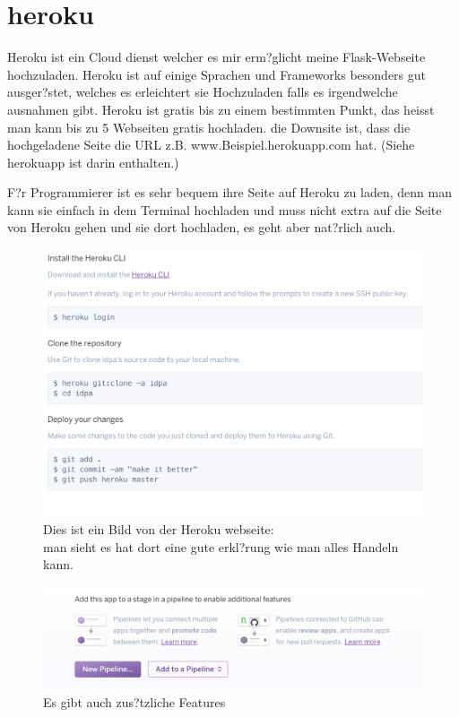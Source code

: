 \documentclass{article}
\begin{document}
\cleardoublepage
















\section{heroku}
Heroku ist ein Cloud dienst welcher es mir erm?glicht meine Flask-Webseite hochzuladen.
Heroku ist auf einige Sprachen und Frameworks besonders gut ausger?stet, welches es erleichtert sie Hochzuladen falls es irgendwelche ausnahmen gibt.
Heroku ist gratis bis zu einem bestimmten Punkt, das heisst man kann bis zu 5 Webseiten gratis hochladen.
die Downsite ist, dass die hochgeladene Seite die URL z.B. www.Beispiel.herokuapp.com hat. (Siehe herokuapp ist darin enthalten.)

F?r Programmierer ist es sehr bequem ihre Seite auf Heroku zu laden, denn man kann sie einfach in dem Terminal hochladen und muss nicht extra auf die Seite
von Heroku gehen und sie dort hochladen, es geht aber nat?rlich auch.


\begin{figure}[ht]
    \centering
    \includegraphics[width=.6\linewidth]{heroku-instructions}
    \caption{Dies ist ein Bild von der Heroku webseite:\\
    man sieht es hat dort eine gute erkl?rung wie man alles Handeln kann.}
    \label{fig:sub1}
    \end{figure}

    \begin{figure}[ht]
        \centering
        \includegraphics[width=.7\linewidth]{heroku-pipeline}
        \caption{Es gibt auch zus?tzliche Features}
        \label{fig:sub1}
        \end{figure}
\end{document}
